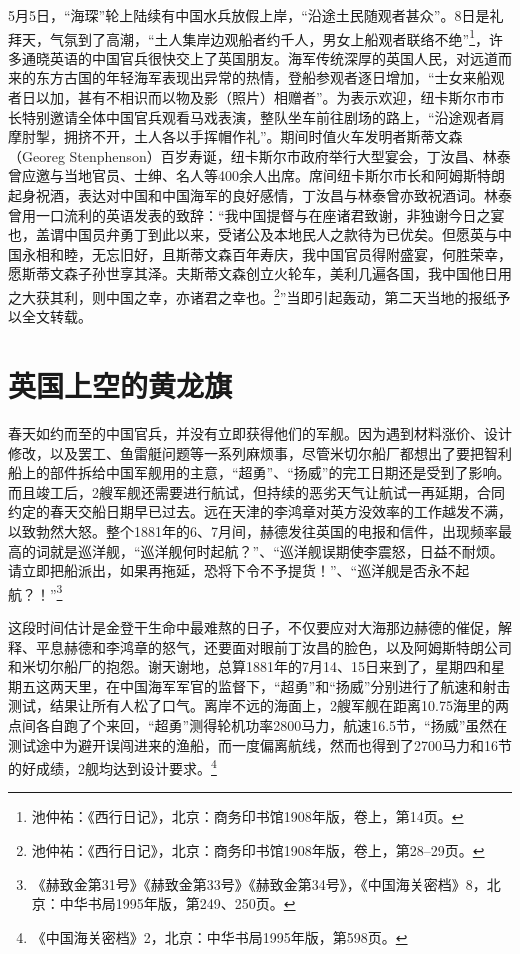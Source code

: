 \documentclass[12pt,UTF8]{ctexbook}
\begin{document}
5月5日，“海琛”轮上陆续有中国水兵放假上岸，“沿途土民随观者甚众”。8日是礼拜天，气氛到了高潮，“土人集岸边观船者约千人，男女上船观者联络不绝”\footnote{池仲祐：《西行日记》，北京：商务印书馆1908年版，卷上，第14页。}，许多通晓英语的中国官兵很快交上了英国朋友。海军传统深厚的英国人民，对远道而来的东方古国的年轻海军表现出异常的热情，登船参观者逐日增加，“士女来船观者日以加，甚有不相识而以物及影（照片）相赠者”。为表示欢迎，纽卡斯尔市市长特别邀请全体中国官兵观看马戏表演，整队坐车前往剧场的路上，“沿途观者肩摩肘掣，拥挤不开，土人各以手挥帽作礼”。期间时值火车发明者斯蒂文森（Georeg Stenphenson）百岁寿诞，纽卡斯尔市政府举行大型宴会，丁汝昌、林泰曾应邀与当地官员、士绅、名人等400余人出席。席间纽卡斯尔市长和阿姆斯特朗起身祝酒，表达对中国和中国海军的良好感情，丁汝昌与林泰曾亦致祝酒词。林泰曾用一口流利的英语发表的致辞：“我中国提督与在座诸君致谢，非独谢今日之宴也，盖谓中国员弁勇丁到此以来，受诸公及本地民人之款待为已优矣。但愿英与中国永相和睦，无忘旧好，且斯蒂文森百年寿庆，我中国官员得附盛宴，何胜荣幸，愿斯蒂文森子孙世享其泽。夫斯蒂文森创立火轮车，美利几遍各国，我中国他日用之大获其利，则中国之幸，亦诸君之幸也。\footnote{池仲祐：《西行日记》，北京：商务印书馆1908年版，卷上，第28--29页。}”当即引起轰动，第二天当地的报纸予以全文转载。

\section{英国上空的黄龙旗}

春天如约而至的中国官兵，并没有立即获得他们的军舰。因为遇到材料涨价、设计修改，以及罢工、鱼雷艇问题等一系列麻烦事，尽管米切尔船厂都想出了要把智利船上的部件拆给中国军舰用的主意，“超勇”、“扬威”的完工日期还是受到了影响。而且竣工后，2艘军舰还需要进行航试，但持续的恶劣天气让航试一再延期，合同约定的春天交船日期早已过去。远在天津的李鸿章对英方没效率的工作越发不满，以致勃然大怒。整个1881年的6、7月间，赫德发往英国的电报和信件，出现频率最高的词就是巡洋舰，“巡洋舰何时起航？”、“巡洋舰误期使李震怒，日益不耐烦。请立即把船派出，如果再拖延，恐将下令不予提货！”、“巡洋舰是否永不起航？！”\footnote{《赫致金第31号》《赫致金第33号》《赫致金第34号》，《中国海关密档》8，北京：中华书局1995年版，第249、250页。}

这段时间估计是金登干生命中最难熬的日子，不仅要应对大海那边赫德的催促，解释、平息赫德和李鸿章的怒气，还要面对眼前丁汝昌的脸色，以及阿姆斯特朗公司和米切尔船厂的抱怨。谢天谢地，总算1881年的7月14、15日来到了，星期四和星期五这两天里，在中国海军军官的监督下，“超勇”和“扬威”分别进行了航速和射击测试，结果让所有人松了口气。离岸不远的海面上，2艘军舰在距离10.75海里的两点间各自跑了个来回，“超勇”测得轮机功率2800马力，航速16.5节，“扬威”虽然在测试途中为避开误闯进来的渔船，而一度偏离航线，然而也得到了2700马力和16节的好成绩，2舰均达到设计要求。\footnote{《中国海关密档》2，北京：中华书局1995年版，第598页。}
\end{document}
